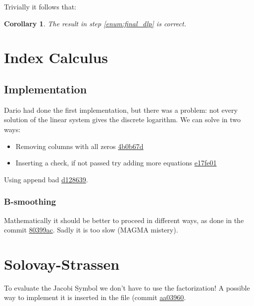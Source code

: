 \documentclass{article}
\theoremstyle{plain}
\newtheorem{cor}[teo]{Corollary}
\theoremstyle{remark}
\theoremstyle{definition}
\begin{document}
Trivially it follows that:

\begin{cor}
	The result in step \ref{enum:final_dlp} is correct.
\end{cor}

\section{Index Calculus}

\subsection{Implementation}

Dario had done the first implementation, but there was a problem: not every solution of the linear system gives the discrete logarithm. We can solve in two ways:
\begin{itemize}
	\item Removing columns with all zeros \href{https://github.com/giacomoborin/project2_MAGMA/pull/30/commits/4b0b67d0dcbe51f01058c64a06a1c39fdb5cf56e}{4b0b67d}
	\item Inserting a check, if not passed try adding more equations \href{https://github.com/giacomoborin/project2_MAGMA/pull/30/commits/e17fe016088c6746c46d52d7154922060f8e5366}{e17fe01}
\end{itemize}



Using append bad \href{https://github.com/giacomoborin/project2_MAGMA/commit/d12863968fe66504486fa7fea78929ab2aa98f43}{d128639}. 

\subsubsection{B-smoothing}

Mathematically it should be better to proceed in different ways, as done in the commit \href{https://github.com/giacomoborin/project2_MAGMA/commit/80399ac928cf19e009451f174adc4138283580f2}{80399ac}. Sadly it is too slow (MAGMA mistery).



\section{Solovay-Strassen}


To evaluate the Jacobi Symbol we don't have to use the factorization! A possible way to implement it is inserted in the file (commit \href{https://github.com/giacomoborin/project2_MAGMA/commit/aa03960b86ec942f5f35c55e297850a3e2b2beba}{aa03960}.
\end{document}

